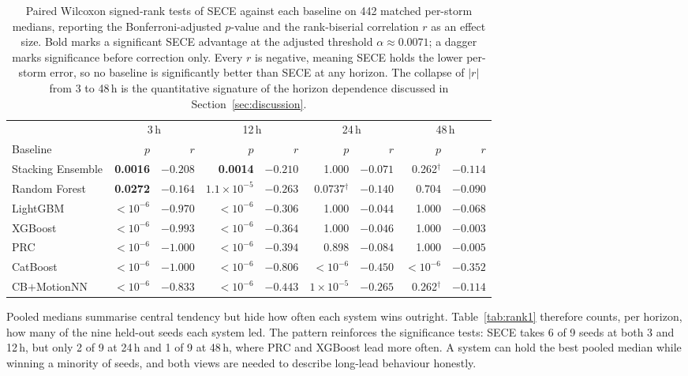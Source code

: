 \documentclass{ametsocv6.1}
\newcommand{\sece}{SECE}
\begin{document}
\begin{table}[ht]
\centering
\footnotesize
\setlength{\tabcolsep}{5pt}
\begin{tabular}{@{}lrrrrrrrr@{}}
\toprule
& \multicolumn{2}{c}{3\,h} & \multicolumn{2}{c}{12\,h}
& \multicolumn{2}{c}{24\,h} & \multicolumn{2}{c}{48\,h} \\
\cmidrule(lr){2-3}\cmidrule(lr){4-5}\cmidrule(lr){6-7}\cmidrule(lr){8-9}
Baseline & $p$ & $r$ & $p$ & $r$ & $p$ & $r$ & $p$ & $r$ \\
\midrule
Stacking Ensemble & \textbf{0.0016} & $-0.208$ & \textbf{0.0014} & $-0.210$ & 1.000 & $-0.071$ & 0.262$^{\dagger}$ & $-0.114$ \\
Random Forest     & \textbf{0.0272} & $-0.164$ & \textbf{$1.1\times10^{-5}$} & $-0.263$ & 0.0737$^{\dagger}$ & $-0.140$ & 0.704 & $-0.090$ \\
LightGBM          & \textbf{$<10^{-6}$} & $-0.970$ & \textbf{$<10^{-6}$} & $-0.306$ & 1.000 & $-0.044$ & 1.000 & $-0.068$ \\
XGBoost           & \textbf{$<10^{-6}$} & $-0.993$ & \textbf{$<10^{-6}$} & $-0.364$ & 1.000 & $-0.046$ & 1.000 & $-0.003$ \\
PRC               & \textbf{$<10^{-6}$} & $-1.000$ & \textbf{$<10^{-6}$} & $-0.394$ & 0.898 & $-0.084$ & 1.000 & $-0.005$ \\
CatBoost          & \textbf{$<10^{-6}$} & $-1.000$ & \textbf{$<10^{-6}$} & $-0.806$ & \textbf{$<10^{-6}$} & $-0.450$ & \textbf{$<10^{-6}$} & $-0.352$ \\
CB$+$MotionNN     & \textbf{$<10^{-6}$} & $-0.833$ & \textbf{$<10^{-6}$} & $-0.443$ & \textbf{$1\times10^{-5}$} & $-0.265$ & 0.262$^{\dagger}$ & $-0.114$ \\
\bottomrule
\end{tabular}
\caption{Paired Wilcoxon signed-rank tests of \sece{} against each baseline on 442
matched per-storm medians, reporting the Bonferroni-adjusted $p$-value and the
rank-biserial correlation $r$ as an effect size. Bold marks a significant \sece{}
advantage at the adjusted threshold $\alpha \approx 0.0071$; a dagger marks
significance before correction only. Every $r$ is negative, meaning \sece{} holds
the lower per-storm error, so no baseline is significantly better than \sece{} at
any horizon. The collapse of $|r|$ from 3 to 48\,h is the quantitative signature
of the horizon dependence discussed in Section~\ref{sec:discussion}.}
\label{tab:wilcox}
\end{table}

Pooled medians summarise central tendency but hide how often each system wins
outright. Table~\ref{tab:rank1} therefore counts, per horizon, how many of the
nine held-out seeds each system led. The pattern reinforces the significance
tests: \sece{} takes 6 of 9 seeds at both 3 and 12\,h, but only 2 of 9 at 24\,h
and 1 of 9 at 48\,h, where PRC and XGBoost lead more often. A system can hold the
best pooled median while winning a minority of seeds, and both views are needed to
describe long-lead behaviour honestly.
\end{document}
